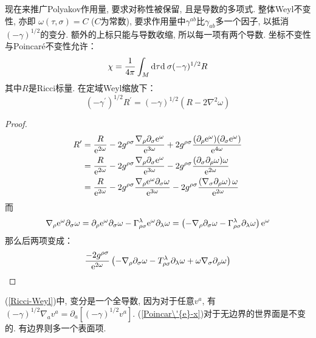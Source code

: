 现在来推广Polyakov作用量, 要求对称性被保留, 且是导数的多项式. 
整体Weyl不变性, 亦即 $\omega(\tau,\sigma)=C$ ($C$为常数), 要求作用量中$\gamma^{ab}$比$\gamma_{ab}$多一个因子, 以抵消$(-\gamma)^{1/2}$的变分. 额外的上标只能与导数收缩, 所以每一项有两个导数. 
坐标不变性与Poincar\'{e}不变性允许：
\begin{equation}
\chi=\frac{1}{4 \pi} \int_{M} \dif \tau \dif \:\sigma(-\gamma)^{1 / 2} R \label{Poincar\'{e}-x}
\end{equation}
其中$R$是Ricci标量. 在定域Weyl缩放下：
\begin{equation}
\left(-\gamma^{\prime}\right)^{1 / 2} R^{\prime}=(-\gamma)^{1 / 2}\left(R-2 \nabla^{2} \omega\right)\label{Ricci-Weyl}
\end{equation}
\begin{tcolorbox}
    \begin{proof}
        \begin{align*}
        R^\prime &=\frac{R}{\mathrm{e}^{2 \omega}}-2 g^{\rho \sigma} \frac{\nabla_{\rho} \partial_{\sigma} \mathrm{e}^{\omega}}{\mathrm{e}^{3 \omega}}+2 g^{\rho \sigma} \frac{(\partial_\rho \mathrm{e}^\omega )(\partial _\sigma \mathrm{e}^\omega)}{\mathrm{e}^{4 \omega}} \\
        &=\frac{R}{\mathrm{e}^{2 \omega}}-2 g^{\rho \sigma} \frac{\nabla_{\rho} \partial_{\sigma} \mathrm{e}^{\omega}}{\mathrm{e}^{3 \omega}}-2 g^{\rho \sigma} \frac{(\partial _\sigma \partial_{\rho} \omega )\omega}{\mathrm{e}^{2 \omega}} \\
        &=\frac{R}{\mathrm{e}^{2 \omega}}-2 g^{\rho \sigma} \frac{\nabla_{\rho} \mathrm{e}^{\omega} \partial_{\sigma} \omega}{\mathrm{e}^{3 \omega}}-2 g^{\rho \sigma} \frac{\left(\nabla_{\sigma} \partial_{\rho} \omega\right) \omega}{\mathrm{e}^{2 \omega}}
        \end{align*}
        而
        \begin{align*}
        \nabla _\rho \mathrm{e}^{\omega} \partial_{\sigma} \omega=\partial_{\rho} \mathrm{e}^{\omega} \partial_{\sigma} \omega-\Gamma_{\rho \sigma}^{\lambda} \mathrm{e}^{\omega} \partial_{\lambda} \omega=\left(-\nabla_{\rho} \partial _\sigma \omega-\Gamma_{\rho \sigma}^{\lambda} \partial _\lambda \omega\right) \mathrm{e}^{\omega}
        \end{align*}
        那么后两项变成：
        \[
        \frac{-2 g^{\rho \sigma}}{\mathrm{e}^{2 \omega}}\left(-\nabla_{\rho} \partial_{\sigma} \omega-T_{\rho \sigma}^{\lambda} \partial_{\lambda} \omega+\omega \nabla_{\sigma} \partial_{\rho} \omega\right)
        \]
        \end{proof}
\end{tcolorbox}
\noindent (\ref{Ricci-Weyl})中, 变分是一个全导数, 因为对于任意$v^a$, 有$(-\gamma)^{1/2}\nabla_a v^a=\partial_a[(-\gamma)^{1/2}v^a]$. (\ref{Poincar\'{e}-x})对于无边界的世界面是不变的. 有边界则多一个表面项. 

